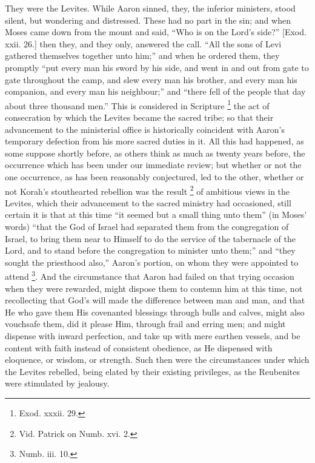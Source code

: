 They were the Levites. While Aaron sinned, they, the inferior
ministers, stood silent, but wondering and distressed. These had no
part in the sin; and when Moses came down from the mount and said,
``Who is on the Lord's side?'' [Exod. xxii. 26.] then they,
and they only, answered the call. ``All the sons of Levi gathered
themselves together unto him;'' and when he ordered them, they
promptly ``put every man his sword by his side, and went in and
out from gate to gate throughout the camp, and slew every man his
brother, and every man his companion, and every man his neighbour;''
and ``there fell of the people that day about three thousand
men.'' This is considered in Scripture \footnote{Exod. xxxii. 29.} the act of consecration by which the Levites became the sacred
tribe; so that their advancement to the ministerial office is
historically coincident with Aaron's temporary defection from his more
sacred duties in it. All this had happened, as some suppose shortly
before, as others think as much as twenty years before, the occurrence
which has been under our immediate review; but whether or not the one
occurrence, as has been reasonably conjectured, led to the other,
whether or not Korah's stouthearted rebellion was the result \footnote{Vid. Patrick on Numb. xvi. 2.} of ambitious views in the Levites, which their advancement to
the sacred ministry had occasioned, still certain it is that at this
time ``it seemed but a small thing unto them'' (in Moses'
words) ``that the God of Israel had separated them from the
congregation of Israel, to bring them near to Himself to do the
service of the tabernacle of the Lord, and to stand before the
congregation to minister unto them;'' and ``they sought the
priesthood also,'' Aaron's portion, on whom they were appointed to
attend \footnote{Numb. iii. 10.}. And the
circumstance that Aaron had failed on that trying occasion when they
were rewarded, might dispose them to contemn him at this time, not
recollecting that God's will made the difference between man and man,
and that He who gave them His covenanted blessings through bulls and
calves, might also vouchsafe them, did it please Him, through frail
and erring men; and might dispense with inward perfection, and take up
with mere earthen vessels, and be content with faith instead of
consistent obedience, as He dispensed with eloquence, or wisdom, or
strength. Such then were the circumstances under which the Levites
rebelled, being elated by their existing privileges, as the Reubenites
were stimulated by jealousy.

